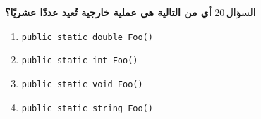 \documentclass[13pt]{beamer}
\begin{document}
\begin{frame}[fragile]{السؤال\,20}
\textbf{أي من التالية هي عملية خارجية تُعيد عددًا عشريًا؟}

\begin{english}
\begin{enumerate}[label=(\alph*)]
  \item \texttt{public static double Foo()}
  \item \texttt{public static int Foo()}
  \item \texttt{public static void Foo()}
  \item \texttt{public static string Foo()}
\end{enumerate}
\end{english}
\end{frame}
\end{document}
